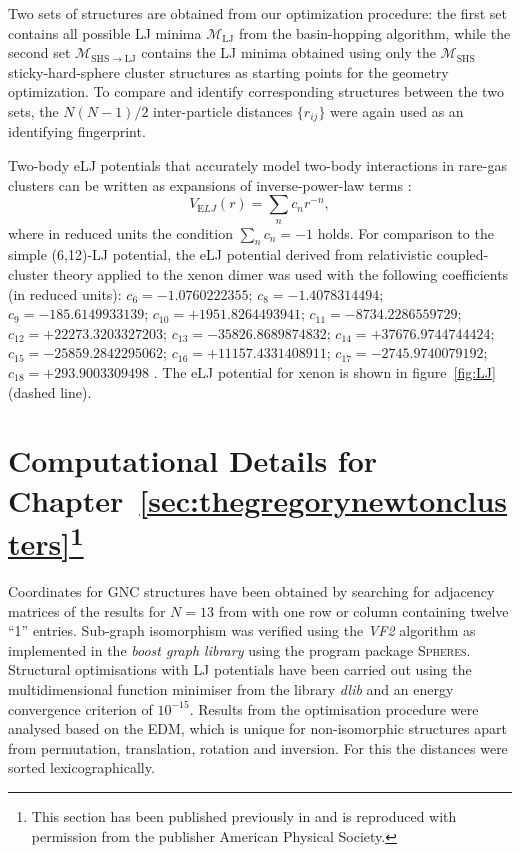 Two sets of structures are obtained from our optimization procedure: the first
set contains all possible LJ minima $\mathcal{M}_\mathrm{LJ}$ from the
basin-hopping algorithm, while the second set $\mathcal{M}_\mathrm{SHS\to LJ}$
contains the LJ minima obtained using only the $\mathcal{M}_\mathrm{SHS}$
sticky-hard-sphere cluster structures as starting points for the geometry
optimization.  To compare and identify corresponding structures between the two
sets, the $N(N-1)/2$ inter-particle distances $\{r_{ij}\}$ were again used as
an identifying fingerprint.

Two-body \ac{eLJ} potentials that accurately model
two-body interactions in rare-gas clusters can be written as expansions of
inverse-power-law terms
\autocite{Schwerdtfeger_ExtensionLennardJonespotential_2006}:
%
\begin{equation} \label{eq:ELJ}
V_{\mathrm ELJ}(r)=\sum_{n} c_nr^{-n},
\end{equation}
%
where in reduced units the condition $\sum_{n} c_n=-1$ holds. For comparison
to the simple (6,12)-\ac{LJ} potential, the \ac{eLJ} potential derived from
relativistic coupled-cluster theory applied to the xenon dimer was used with the
following coefficients (in reduced units):
$c_6=-1.0760222355$; $c_8=-1.4078314494$; $c_9=-185.6149933139$;
$c_{10}=+1951.8264493941$; $c_{11}=-8734.2286559729$;
$c_{12}=+22273.3203327203$; $c_{13}=-35826.8689874832$;
$c_{14}=+37676.9744744424$; $c_{15}=-25859.2842295062$;
$c_{16}=+11157.4331408911$; $c_{17}=-2745.9740079192$; $c_{18}=+293.9003309498$
\autocite{Jerabek_relativisticcoupledclusterinteraction_2017}. The \ac{eLJ}
potential for xenon is shown in figure~\ref{fig:LJ} (dashed line).

\section[Computational Details for
Chapter~\ref{sec:thegregorynewtonclusters}]{Computational Details for
Chapter~\ref{sec:thegregorynewtonclusters}\footnote{This section has been
published previously in
\autocite{Trombach_GregoryNewtonproblemkissing_2018}
and is reproduced with permission from the publisher 
American Physical Society.}}

Coordinates for \ac{GNC} structures have been obtained by searching for
adjacency matrices of the results for $N=13$ from
\citeauthor{Holmes-Cerfon_EnumeratingRigidSphere_2016}
\autocite{Holmes-Cerfon_EnumeratingRigidSphere_2016} with one row or column
containing twelve ``1'' entries. Sub-graph isomorphism was verified using the
\textit{VF2} algorithm \autocite{Cordella_SubGraphIsomorphism_2004} as
implemented in the \textit{boost graph library}
\autocite{Siek_BoostGraphLibrary_2002} using the program package
\textsc{Spheres}. Structural optimisations with \ac{LJ} potentials have been carried
out using the multidimensional function minimiser from the \Cpp library
\textit{dlib} \autocite{King_DlibmlMachineLearning_2009} and an energy
convergence criterion of $10^{-15}$. Results from the optimisation procedure
were analysed based on the \ac{EDM}, which is unique for
non-isomorphic structures apart from permutation, translation, rotation and
inversion. For this the distances were sorted lexicographically.
